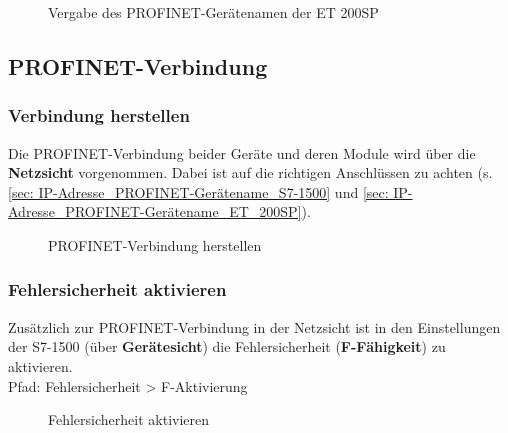 \begin{figure}[H]
   \centering
   \caption[Vergabe des PROFINET-Gerätenamen der ET 200SP]{Vergabe des PROFINET-Gerätenamen der ET 200SP}
   \label{fig:Bild4.10}
\end{figure}

\subsection{PROFINET-Verbindung} \label{sec:ergebnisse}

\subsubsection{Verbindung herstellen} \label{sec: Verbindung herstellen}
Die PROFINET-Verbindung beider Geräte und deren Module wird über die \textbf{Netzsicht} vorgenommen. Dabei ist auf die richtigen Anschlüssen zu achten (s. \autoref{sec: IP-Adresse_PROFINET-Gerätename_S7-1500} und \autoref{sec: IP-Adresse_PROFINET-Gerätename_ET_200SP}).

\begin{figure}[H]
   \centering
   \caption[PROFINET-Verbindung herstellen]{PROFINET-Verbindung herstellen}
   \label{fig:Bild5.1}
\end{figure}

\subsubsection{Fehlersicherheit aktivieren}
Zusätzlich zur PROFINET-Verbindung in der Netzsicht ist in den Einstellungen der S7-1500 (über \textbf{Gerätesicht}) die Fehlersicherheit (\textbf{F-Fähigkeit}) zu aktivieren.\\
Pfad: Fehlersicherheit > F-Aktivierung

\begin{figure}[H]
   \centering
   \caption[Fehlersicherheit aktivieren]{Fehlersicherheit aktivieren}
   \label{fig:Bild5.2}
\end{figure}

